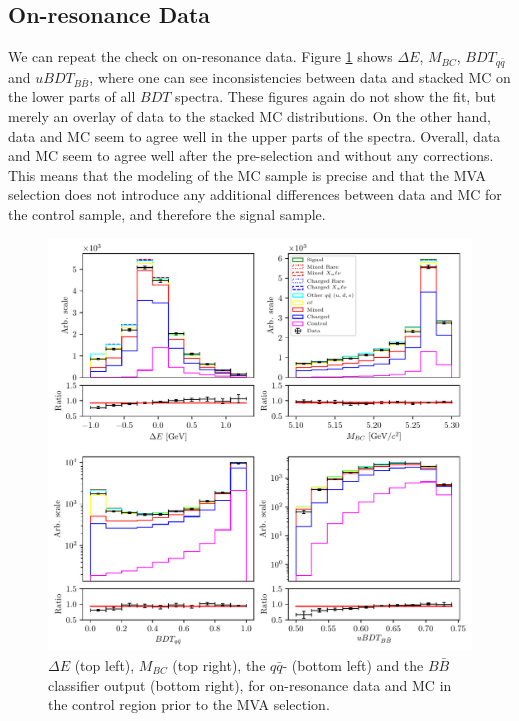 \subsection{On-resonance Data}

We can repeat the check on on-resonance data. Figure \ref{fig:onres_control} shows $\Delta E$, $M_{BC}$, $BDT_{q \bar q}$ and $uBDT_{B \bar B}$, where one can see inconsistencies between data and stacked MC on the lower parts of all $BDT$ spectra. These figures again do not show the fit, but merely an overlay of data to the stacked MC distributions. On the other hand, data and MC seem to agree well in the upper parts of the spectra. Overall, data and MC seem to agree well after the pre-selection and without any corrections. This means that the modeling of the MC sample is precise and that the MVA selection does not introduce any additional differences between data and MC for the control sample, and therefore the signal sample.
\begin{figure}[H]
	\centering
	\captionsetup{width=0.8\linewidth}
	\includegraphics[width=\linewidth]{fig/onres_control}
	\caption{$\Delta E$ (top left), $M_{BC}$ (top right), the $q \bar q$- (bottom left) and the $B \bar B$ classifier output (bottom right), for on-resonance data and MC in the control region prior to the MVA selection.}
	\label{fig:onres_control}
\end{figure}